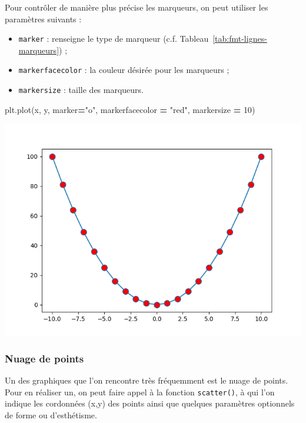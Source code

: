 \documentclass[12pt,]{book}
\newenvironment{Shaded}{\begin{snugshade}}{\end{snugshade}}
\newcommand{\DecValTok}[1]{\textcolor[rgb]{0.00,0.00,0.81}{#1}}
\newcommand{\StringTok}[1]{\textcolor[rgb]{0.31,0.60,0.02}{#1}}
\newcommand{\OperatorTok}[1]{\textcolor[rgb]{0.81,0.36,0.00}{\textbf{#1}}}
\newcommand{\NormalTok}[1]{#1}
\providecommand{\tightlist}{%
  \setlength{\itemsep}{0pt}\setlength{\parskip}{0pt}}
\numberwithin{equation}{section}
\numberwithin{countremarque}{section}
\begin{document}
Pour contrôler de manière plus précise les marqueurs, on peut utiliser
les paramètres suivants :

\begin{itemize}
\tightlist
\item
  \texttt{marker} : renseigne le type de marqueur (c.f.
  Tableau~\ref{tab:fmt-lignes-marqueurs}) ;
\item
  \texttt{markerfacecolor} : la couleur désirée pour les marqueurs ;
\item
  \texttt{markersize} : taille des marqueurs.
\end{itemize}

\begin{Shaded}
\begin{Highlighting}[]
\NormalTok{plt.plot(x, y, marker}\OperatorTok{=}\StringTok{"o"}\NormalTok{, markerfacecolor }\OperatorTok{=} \StringTok{"red"}\NormalTok{, markersize }\OperatorTok{=} \DecValTok{10}\NormalTok{)}
\end{Highlighting}
\end{Shaded}

\begin{center}\includegraphics[width=9.03in]{figs/pyplot/lignes_marqueurs} \end{center}

\subsubsection{Nuage de points}\label{nuage-de-points}

Un des graphiques que l'on rencontre très fréquemment est le nuage de
points. Pour en réaliser un, on peut faire appel à la fonction
\texttt{scatter()}, à qui l'on indique les cordonnées (x,y) des points
ainsi que quelques paramètres optionnels de forme ou d'esthétisme.
\end{document}
